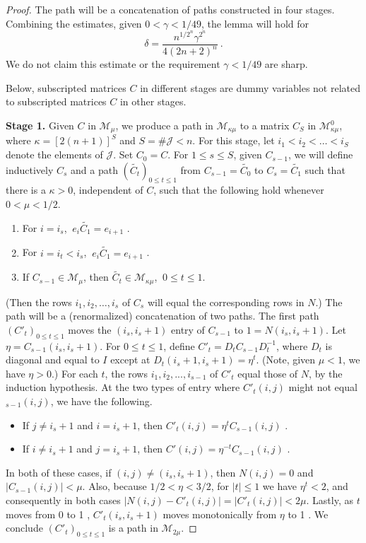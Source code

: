 \documentclass{amsart}
\theoremstyle{definition}
\theoremstyle{remark}
\numberwithin{equation}{section}
\begin{document}
{{\begin{proof} 

The path will be a concatenation of paths constructed in four  stages. 
Combining the estimates, given $0< \gamma < 1/49$, the lemma 
will hold for 
\[
\delta = \frac{ n^{1/2^n} \gamma^{2^n}}{4(2n+2)^n}\ . 
\]
We do not claim this estimate or the requirement $\gamma < 1/49$ are sharp.  

Below,  subscripted matrices $C$ in different 
stages are dummy variables not related to  subscripted matrices $C$
in other stages. 

{\bf Stage 1.} 
 Given $C$ in $\mathcal M_{\mu}$, we produce 
a path in $\mathcal M_{\kappa\mu}$ to a matrix $C_S$
 in $\mathcal M^0_{\kappa\mu}$, where 
$\kappa =[2(n+1)]^S$ and $S=\# \mathcal J<n$. 
For this stage,  
let  $i_1< i_2 < \dots < i_S$  denote the elements of $\mathcal J$. 
Set $C_0=C$. 
For $1\leq s\leq S$, given $C_{s-1}$, 
we will 
define inductively 
$C_s$ and 
a path $(\widetilde{C_t})_{0\leq t \leq 1}$  
from $C_{s-1}=\widetilde{C_0}$ to $C_{s}=\widetilde{C_1}$
such that there is  a $\kappa >0$, independent of 
$C$, such that the following hold whenever  $0<\mu < 1/2$.

\begin{enumerate} 
\item 
For $i=i_s$,  $\ e_i\widetilde{C_1} =e_{i+1}$ . 
\item 
For $i=i_t < i_s$, 
  $\ e_i\widetilde{C_1} =e_{i+1}$ . 
\item 
If $C_{s-1}\in \mathcal M_{\mu}$, then 
$\widetilde{C_t}\in \mathcal M_{\kappa \mu}$, $\ 0\leq t \leq 1$.  
\end{enumerate} 
(Then the rows $i_1,i_2,\dots , i_s$ of $C_s$ will equal 
the corresponding rows in  $N$.) 
The path will be a (renormalized) 
concatenation of two paths. The first 
path $(C'_t)_{0\leq t \leq 1}$  
moves the $(i_s,i_s+1)$ entry of $C_{s-1}$ to $1= N(i_s,i_s+1)$. 
Let $\eta= C_{s-1}(i_s,i_s+1)$. 
For $0\leq t\leq 1$, define 
$C'_t= D_tC_{s-1}D_t^{-1}$, where $D_t$ is diagonal and equal to $I$ except at 
$D_t(i_s + 1, i_s +1) = \eta^t$. (Note, given 
 $\mu < 1$, we have $\eta >0$.) 
For each $t$, the rows $i_1,i_2, ... ,i_{s-1}$ of $C'_t$ equal 
those of $N$, by the induction hypothesis. 
At the two types of entry where $C'_t(i,j)$ might not 
equal $_{s-1}(i,j)$, we have the following.   
\begin{itemize} 
\item 
If $j\neq i_s+1$ and $i=i_s+1$, 
then $C'_t(i,j)=\eta^tC_{s-1}(i,j)$ . 
\item 
If $i\neq i_s+1$ and $j=i_s+1$, then 
$C'(i,j)=\eta^{-t}C_{s-1}(i,j) $ .
\end{itemize} 
In both of these cases, if $(i,j)\neq (i_s,i_s+1)$, then 
$N(i,j)=0$ and $|C_{s-1}(i,j)|<\mu$. 
Also, because $1/2< \eta < 3/2$, 
for $|t|\leq 1$ we have $\eta^t < 2$, 
and consequently in both cases  
$|N(i,j)-C'_t(i,j)|= |C'_t(i,j)|<2\mu$. 
Lastly, as $t$ moves from 0 to 1 , 
$C'_t(i_s,i_s+1)$ moves monotonically from $\eta $ to 1 .  
We conclude $(C'_t)_{0\leq t \leq 1}$ is a path in 
$\mathcal M_{2\mu}$. 


\end{proof}}}
\end{document}
